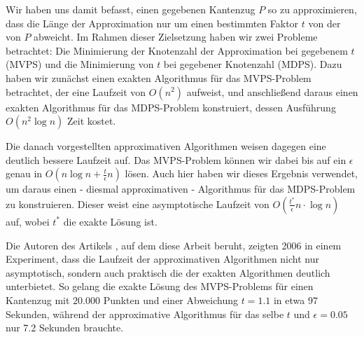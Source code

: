  Wir haben uns damit befasst, einen gegebenen Kantenzug $P$ so zu approximieren, dass die Länge der Approximation nur um einen bestimmten Faktor $t$ von der von $P$ abweicht. 
Im Rahmen dieser Zielsetzung haben wir zwei Probleme betrachtet: Die Minimierung der Knotenzahl der Approximation bei gegebenem $t$ (MVPS) und die Minimierung von $t$ bei gegebener Knotenzahl (MDPS).
Dazu haben wir zunächst einen exakten Algorithmus für das MVPS-Problem betrachtet, der eine Laufzeit von $O(n^2)$ aufweist, und anschließend daraus einen exakten Algorithmus für das MDPS-Problem konstruiert, dessen Ausführung $O(n^2 \log n)$ Zeit kostet.

Die danach vorgestellten approximativen Algorithmen weisen dagegen eine deutlich bessere Laufzeit auf.
Das MVPS-Problem können wir dabei bis auf ein $\epsilon$ genau in $O(n \log n + \frac{t}{\epsilon}n)$ lösen.
Auch hier haben wir dieses Ergebnis verwendet, um daraus einen - diesmal approximativen - Algorithmus für das MDPS-Problem zu konstruieren. Dieser weist eine asymptotische Laufzeit von $O(\frac{t^*}{\epsilon}n \cdot \log n)$ auf, wobei $t^*$ die exakte Lösung ist.

Die Autoren des Artikels \cite{gudmundsson}, auf dem diese Arbeit beruht, zeigten 2006 in einem Experiment, dass die Laufzeit der approximativen Algorithmen nicht nur asymptotisch, sondern auch praktisch die der exakten Algorithmen deutlich unterbietet.
So gelang die exakte Lösung des MVPS-Problems für einen Kantenzug mit $20.000$ Punkten und einer Abweichung $t = 1.1$ in etwa 97 Sekunden, während der approximative Algorithmus für das selbe $t$ und $\epsilon = 0.05$ nur 7.2 Sekunden brauchte.